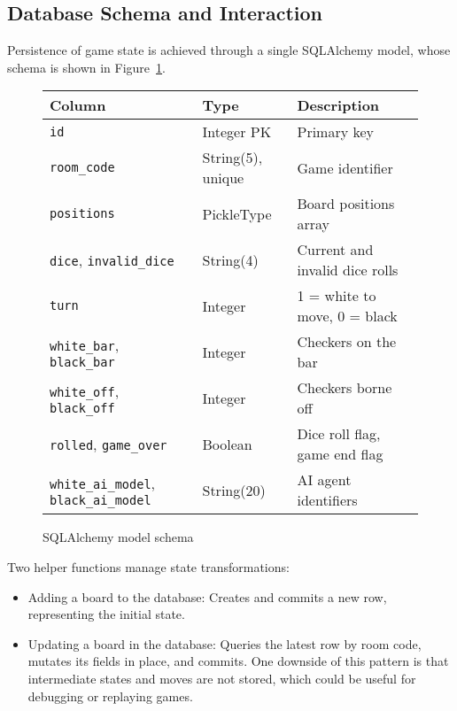\subsection{Database Schema and Interaction}
Persistence of game state is achieved through a single SQLAlchemy model, whose schema is shown in Figure~\ref{fig:game-schema}.

\begin{figure}[h]
\centering
\begin{tabular}{|l|l|l|}
\hline
\textbf{Column}             & \textbf{Type}          & \textbf{Description}               \\ \hline
\texttt{id}                 & Integer PK             & Primary key         \\ \hline
\texttt{room\_code}          & String(5), unique      & Game identifier                    \\ \hline
\texttt{positions}          & PickleType              & Board positions array   \\ \hline
\texttt{dice}, \texttt{invalid\_dice} & String(4)             & Current and invalid dice rolls     \\ \hline
\texttt{turn}               & Integer                & 1 = white to move, 0 = black      \\ \hline
\texttt{white\_bar}, \texttt{black\_bar} & Integer       & Checkers on the bar                \\ \hline
\texttt{white\_off}, \texttt{black\_off} & Integer      & Checkers borne off                 \\ \hline
\texttt{rolled}, \texttt{game\_over}  & Boolean        & Dice roll flag, game end flag      \\ \hline
\texttt{white\_ai\_model}, \texttt{black\_ai\_model} & String(20) & AI agent identifiers            \\ \hline
\end{tabular}
\caption{SQLAlchemy model schema}
\label{fig:game-schema}
\end{figure}

Two helper functions manage state transformations:
\begin{itemize}
\item Adding a board to the database: Creates and commits a new row, representing the initial state.
\item Updating a board in the database: Queries the latest row by room code, mutates its fields in place, and commits. One downside of this pattern is that intermediate states and moves are not stored, which could be useful for debugging or replaying games.
\end{itemize}


